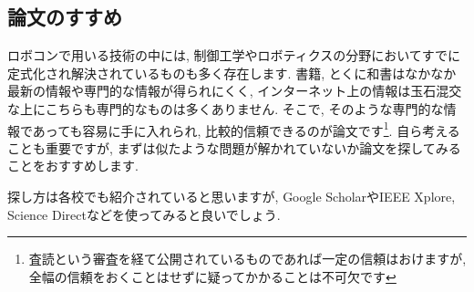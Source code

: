 \subsection{論文のすすめ}
ロボコンで用いる技術の中には, 制御工学やロボティクスの分野においてすでに定式化され解決されているものも多く存在します. 
書籍, とくに和書はなかなか最新の情報や専門的な情報が得られにくく, インターネット上の情報は玉石混交な上にこちらも専門的なものは多くありません. 
そこで, そのような専門的な情報であっても容易に手に入れられ, 比較的信頼できるのが論文です\footnote{査読という審査を経て公開されているものであれば一定の信頼はおけますが, 全幅の信頼をおくことはせずに疑ってかかることは不可欠です}. 
自ら考えることも重要ですが, まずは似たような問題が解かれていないか論文を探してみることをおすすめします. 
\par
探し方は各校でも紹介されていると思いますが, Google ScholarやIEEE Xplore, Science Directなどを使ってみると良いでしょう. 
%